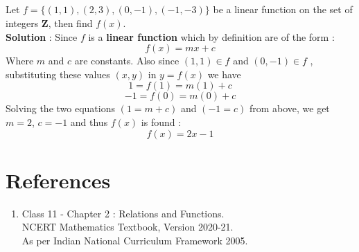 \documentclass[12pt, letterpaper]{article}
\begin{document}
\subsection{}
Let $f = \{(1,1), (2,3), (0,-1), (-1,-3)\}$ be a linear function on the set of integers $\mathbf{Z}$, then find $f(x)$.\\
\textbf{Solution} : Since $f$ is a \textbf{linear function} which by definition are of the form : 
\begin{displaymath}
f(x) = mx + c
\end{displaymath}
Where $m$ and $c$ are constants. Also since $(1,1) \in f$ and $(0,-1) \in f$ , substituting these values $(x,y)$ in $y = f(x)$ we have 
\begin{displaymath}
1 = f(1) = m(1) + c
\end{displaymath}
\begin{displaymath}
-1 = f(0) = m(0) + c
\end{displaymath}
Solving the two equations $(1 = m + c)$ and $(-1 = c)$ from above, we get $m = 2$, $c = -1$ and thus $f(x)$ is found : 
\begin{displaymath}
f(x) = 2x-1
\end{displaymath}  

\section{References}
\begin{enumerate}
    \item Class 11 - Chapter 2 : Relations and Functions.\\ 
    NCERT Mathematics Textbook, Version 2020-21.\\
    As per Indian National Curriculum Framework 2005.
\end{enumerate}
\end{document}
